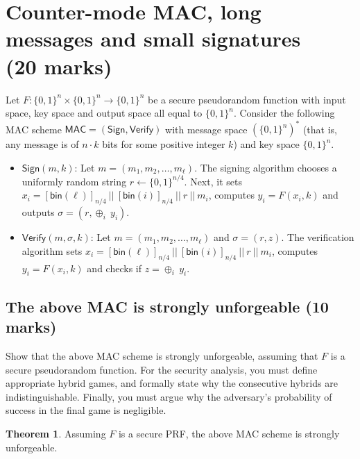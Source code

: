 \documentclass[10pt,addpoints]{exam}
\newcommand{\mac}{\mathsf{MAC}}
\newcommand{\sign}{\mathsf{Sign}}
\newcommand{\verify}{\mathsf{Verify}}
\newcommand{\bit}{\{0,1\}}
\newcommand{\bin}{\mathsf{bin}}
\theoremstyle{definition}
\newtheorem{theorem}{Theorem}[section]
\begin{document}
\vspace{0.4cm}



\color{blue}
\section{Counter-mode MAC, long messages and small signatures \\ (20 marks)}    
    \newcommand{\macell}{\mathsf{MAC}_{\ell}}
    \newcommand{\signell}{\sign_{\ell}}
    \newcommand{\verifyell}{\verify_{\ell}}
      
    Let $F : \bit^n \times \bit^n \to \bit^n$ be a secure pseudorandom function with input space, key space and output space all equal to $\bit^n$. Consider the following MAC scheme $\mac = (\sign, \verify)$ with message space $(\bit^n)^*$ (that is, any message is of $n\cdot k$ bits for some positive integer $k$) and key space $\bit^n$. 

    \begin{itemize}
        \item $\sign(m, k)$: Let $m=(m_1, m_2, \ldots, m_{\ell})$. The signing algorithm chooses a uniformly random string $r \gets \bit^{n/4}$. Next, it sets $x_i = [\bin(\ell)]_{n/4} ~||~ [\bin(i)]_{n/4} ~||~  r ~||~ m_i$, computes $y_i = F(x_i, k)$ and outputs $\sigma = (r, \oplus_i~ y_i)$. 

        \item $\verify(m, \sigma, k)$: Let $m=(m_1, m_2, \ldots, m_{\ell})$ and $\sigma = (r, z)$. The verification algorithm sets $x_i = [\bin(\ell)]_{n/4} ~||~ [\bin(i)]_{n/4} ~||~  r ~||~ m_i$, computes $y_i = F(x_i, k)$ and checks if $z = \oplus_i ~ y_i$. 
    \end{itemize}

    \subsection{The above MAC is strongly unforgeable (10 marks)}

    {
        Show that the above MAC scheme is strongly unforgeable, assuming that $F$ is a secure pseudorandom function. For the security analysis, you must define appropriate hybrid games, and formally state why the consecutive hybrids are indistinguishable. Finally, you must argue why the adversary's probability of success in the final game is negligible.
    }


    \color{black}

    \begin{theorem}
        Assuming $F$ is a secure PRF, the above MAC scheme is strongly unforgeable. 
    \end{theorem}
\end{document}
